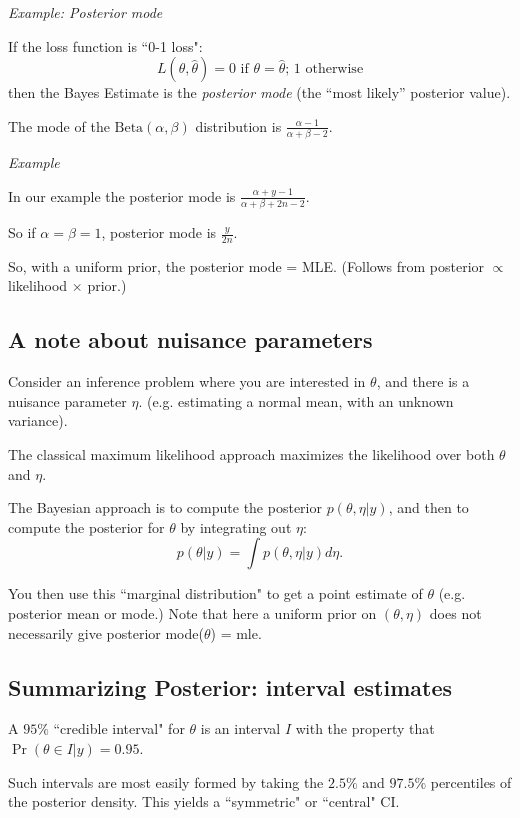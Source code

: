 {\color{section0}\em Example: Posterior mode}

If the loss function is ``0-1 loss": 
$$L(\theta,\hat{\theta}) = 0 \text{ if $\theta = \hat{\theta}$; 1 otherwise}$$
then the Bayes Estimate is the {\em posterior mode} (the ``most
likely'' posterior value).

The mode of the $\mbox{Beta}\left( {\alpha ,\beta } \right)$
 distribution is $\frac{{\alpha  - 1}}{{\alpha  + \beta  - 2}}$.
    
{\em Example}

In our example the posterior mode is $\frac{{\alpha  + y - 1}}{{\alpha  +
\beta  + 2n - 2}}$.

So if $\alpha=\beta=1$, posterior mode is $\frac{y}{2n}$.

So, with a uniform prior, the posterior mode = MLE. (Follows
from posterior $\propto$ likelihood $\times$ prior.)
    \es\bs
    
 \subsection*{A note about nuisance parameters}
   
  Consider an inference problem where you are interested
   in $\theta$, and there is a nuisance parameter $\eta$. (e.g. estimating a normal
   mean, with an unknown variance).
   
   The classical maximum likelihood approach maximizes the likelihood over both $\theta$ and $\eta$.
    
    The Bayesian approach is to compute the posterior $p(\theta,\eta  | y)$, and then to compute the
    posterior for $\theta$ by integrating out $\eta$:
    $$p(\theta | y) = \int p(\theta,\eta  | y) d\eta.$$ 
    
    You then use this ``marginal distribution" to get a point estimate of $\theta$ (e.g. posterior mean or mode.) Note that here a uniform prior on $(\theta,\eta)$ does not necessarily give posterior mode($\theta$) = mle.


\subsection*{Summarizing Posterior: interval estimates}

A $95\%$ ``credible interval" for $\theta$ is an interval $I$ with the property
that $\Pr(\theta \in I | y) = 0.95$.

Such intervals are most easily formed by taking the $2.5\%$ and $97.5\%$ percentiles of the posterior
density. This yields a ``symmetric" or ``central" CI.


